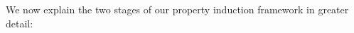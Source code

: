 \documentclass[10pt,letterpaper]{article}
\newcommand{\km}[1]{\textcolor{purple}{$_{KM}$[#1]}}
\begin{document}
We now explain the two stages of our property induction framework in greater detail:



\end{document}
